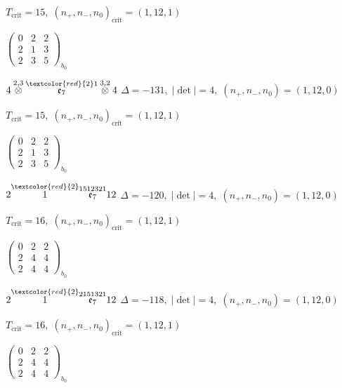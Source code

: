 \documentclass[10pt]{article}
\begin{document}
\hspace{1em}$T_{\text{crit}}=15,\; (n_+,n_-,n_0)_{\text{crit}}=(1,12,1)$

\hspace{2em}$\left(\begin{smallmatrix}0 & 2 & 2 \\ 2 & 1 & 3 \\ 2 & 3 & 5\end{smallmatrix}\right)_{\!b_0}$

\smallskip

$4\overset{2,3}{\otimes}\overset{\textcolor{red}{2}1}{\mathfrak{e}_7}\overset{3,2}{\otimes}4$ \quad $\Delta=-131,\; |\det|=4,\; (n_+,n_-,n_0)=(1,12,0)$

\hspace{1em}$T_{\text{crit}}=15,\; (n_+,n_-,n_0)_{\text{crit}}=(1,12,1)$

\hspace{2em}$\left(\begin{smallmatrix}0 & 2 & 2 \\ 2 & 1 & 3 \\ 2 & 3 & 5\end{smallmatrix}\right)_{\!b_0}$

\smallskip

$2\overset{\textcolor{red}{2}}{1}\overset{1512321}{\mathfrak{e}_7}12$ \quad $\Delta=-120,\; |\det|=4,\; (n_+,n_-,n_0)=(1,12,0)$

\hspace{1em}$T_{\text{crit}}=16,\; (n_+,n_-,n_0)_{\text{crit}}=(1,12,1)$

\hspace{2em}$\left(\begin{smallmatrix}0 & 2 & 2 \\ 2 & 4 & 4 \\ 2 & 4 & 4\end{smallmatrix}\right)_{\!b_0}$

\smallskip

$2\overset{\textcolor{red}{2}}{1}\overset{2151321}{\mathfrak{e}_7}12$ \quad $\Delta=-118,\; |\det|=4,\; (n_+,n_-,n_0)=(1,12,0)$

\hspace{1em}$T_{\text{crit}}=16,\; (n_+,n_-,n_0)_{\text{crit}}=(1,12,1)$

\hspace{2em}$\left(\begin{smallmatrix}0 & 2 & 2 \\ 2 & 4 & 4 \\ 2 & 4 & 4\end{smallmatrix}\right)_{\!b_0}$
\end{document}
